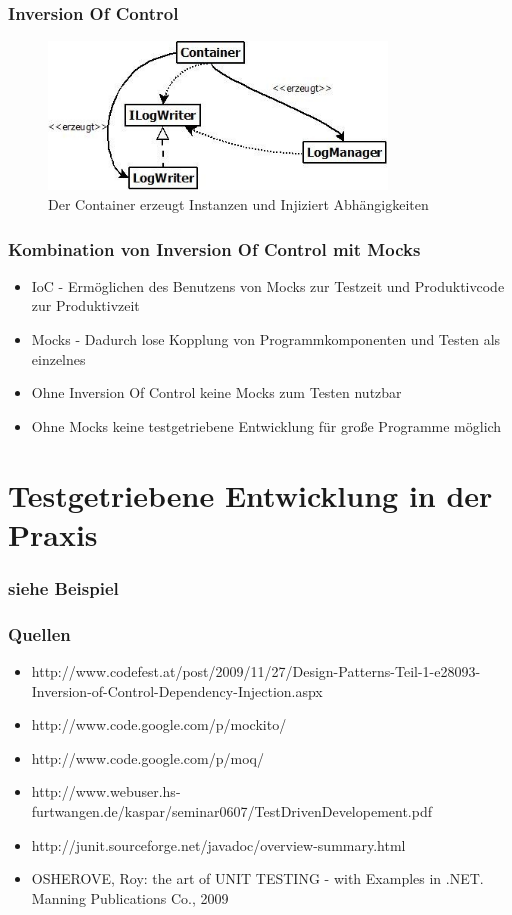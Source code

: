 \documentclass{beamer}
\begin{document}
\begin{frame}
\frametitle{Inversion Of Control}
\begin{figure}[htbp]
\includegraphics[width=9cm]{logging_looseCoupled.jpg}
\caption{Der Container erzeugt Instanzen und Injiziert Abhängigkeiten}
\end{figure}
\end{frame}

\begin{frame}
\frametitle{Kombination von Inversion Of Control mit Mocks}
\begin{itemize}
\item IoC - Ermöglichen des Benutzens von Mocks zur Testzeit und Produktivcode zur Produktivzeit
\item Mocks - Dadurch lose Kopplung von Programmkomponenten und Testen als einzelnes\\
\item Ohne Inversion Of Control keine Mocks zum Testen nutzbar
\item Ohne Mocks keine testgetriebene Entwicklung für große Programme möglich
\end{itemize}
\end{frame}

\section{Testgetriebene Entwicklung in der Praxis}
\begin{frame}
\frametitle{siehe Beispiel}
\end{frame}

\begin{appendix}
\begin{frame}
\frametitle{Quellen}
\begin{itemize}
\item http://www.codefest.at/post/2009/11/27/Design-Patterns-Teil-1-e28093-Inversion-of-Control-Dependency-Injection.aspx
\item http://www.code.google.com/p/mockito/
\item http://www.code.google.com/p/moq/
\item http://www.webuser.hs-furtwangen.de/kaspar/seminar0607/TestDrivenDevelopement.pdf
\item http://junit.sourceforge.net/javadoc/overview-summary.html
\item OSHEROVE, Roy: the art of UNIT TESTING - with Examples in .NET. Manning Publications Co., 2009
\end{itemize}
\end{frame}
\end{appendix}
\end{document}
